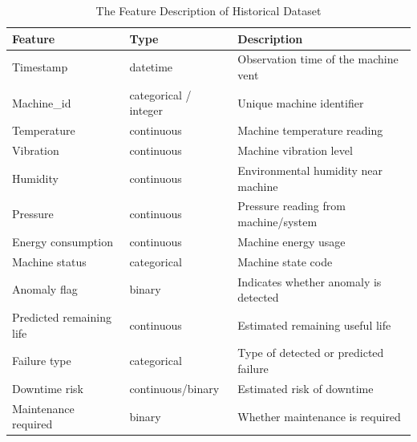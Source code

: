 \begin{table}[htbp]
\centering
\caption{The Feature Description of Historical Dataset}
\label{table:feature_description}
\begin{tabularx}{\textwidth}{l l X}
\toprule
Feature & Type & Description \\
\midrule
Timestamp & datetime & Observation time of the machine vent \\
Machine\_id & categorical / integer & Unique machine identifier \\
Temperature & continuous & Machine temperature reading \\
Vibration & continuous & Machine vibration level \\
Humidity & continuous & Environmental humidity near machine \\
Pressure & continuous & Pressure reading from machine/system \\
Energy consumption & continuous & Machine energy usage \\
Machine status & categorical & Machine state code \\
Anomaly flag & binary & Indicates whether anomaly is detected \\
Predicted remaining life & continuous & Estimated remaining useful life \\
Failure type & categorical & Type of detected or predicted failure \\
Downtime risk & continuous/binary & Estimated risk of downtime \\
Maintenance required & binary & Whether maintenance is required \\
\bottomrule
\end{tabularx}
\end{table}
